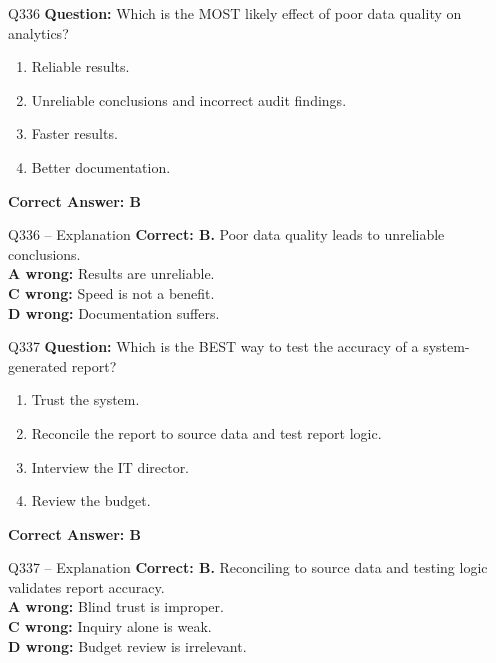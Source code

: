\documentclass[aspectratio=169,10pt]{beamer}
\begin{document}
	\begin{frame}[t]{Q336}
		\small
		\textbf{Question:} Which is the MOST likely effect of poor data quality on analytics?
		\begin{enumerate}[label=\Alph*.,itemsep=1pt,topsep=2pt]
			\item Reliable results.
			\item Unreliable conclusions and incorrect audit findings.
			\item Faster results.
			\item Better documentation.
		\end{enumerate}
		\vspace{4pt}
		\textbf{Correct Answer: B}
	\end{frame}
	
	\begin{frame}[t]{Q336 -- Explanation}
		\small
		\textbf{Correct: B.} Poor data quality leads to unreliable conclusions. \\[4pt]
		\textbf{A wrong:} Results are unreliable. \\[2pt]
		\textbf{C wrong:} Speed is not a benefit. \\[2pt]
		\textbf{D wrong:} Documentation suffers.
	\end{frame}
	
	\begin{frame}[t]{Q337}
		\small
		\textbf{Question:} Which is the BEST way to test the accuracy of a system-generated report?
		\begin{enumerate}[label=\Alph*.,itemsep=1pt,topsep=2pt]
			\item Trust the system.
			\item Reconcile the report to source data and test report logic.
			\item Interview the IT director.
			\item Review the budget.
		\end{enumerate}
		\vspace{4pt}
		\textbf{Correct Answer: B}
	\end{frame}
	
	\begin{frame}[t]{Q337 -- Explanation}
		\small
		\textbf{Correct: B.} Reconciling to source data and testing logic validates report accuracy. \\[4pt]
		\textbf{A wrong:} Blind trust is improper. \\[2pt]
		\textbf{C wrong:} Inquiry alone is weak. \\[2pt]
		\textbf{D wrong:} Budget review is irrelevant.
	\end{frame}
	
\end{document}
